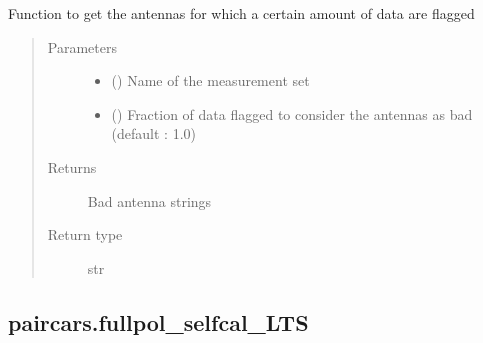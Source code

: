 \documentclass[letterpaper,10pt,english]{sphinxmanual}
\begin{document}
\begin{fulllineitems}
\label{\detokenize{paircars:paircars.flagger.get_bad_ants}}
\sphinxAtStartPar
Function to get the antennas for which a certain amount of data are flagged
\begin{quote}\begin{description}
\item[{Parameters}] \leavevmode\begin{itemize}
\item {} 
\sphinxAtStartPar
{} () \textendash{} Name of the measurement set

\item {} 
\sphinxAtStartPar
{} () \textendash{} Fraction of data flagged to consider the antennas as bad (default : 1.0)

\end{itemize}

\item[{Returns}] \leavevmode
\sphinxAtStartPar
Bad antenna strings

\item[{Return type}] \leavevmode
\sphinxAtStartPar
str

\end{description}\end{quote}

\end{fulllineitems}



\subsection{paircars.fullpol\_selfcal\_LTS}
\label{\detokenize{paircars:module-paircars.fullpol_selfcal_LTS}}\label{\detokenize{paircars:paircars-fullpol-selfcal-lts}}
\end{document}
